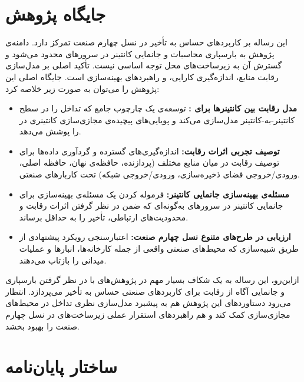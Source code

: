 \section{جایگاه پژوهش}

این رساله بر کاربردهای حساس به تأخیر در نسل چهارم صنعت تمرکز دارد. دامنه‌ی پژوهش به بارسپاری محاسبات و جانمایی کانتینر در سرورهای  محدود می‌شود و گسترش آن به زیرساخت‌های محل توجه اساسی نیست. تأکید اصلی بر مدل‌سازی رقابت منابع، اندازه‌گیری کارایی، و راهبردهای بهینه‌سازی است.
جایگاه اصلی این پژوهش را می‌توان به صورت زیر خلاصه کرد:

\begin{itemize}
\item
\textbf{مدل رقابت بین کانتینر‌ها برای :}
توسعه‌ی یک چارچوب جامع که تداخل را در سطح کانتینر-به-کانتینر مدل‌سازی می‌کند و پویایی‌های پیچیده‌ی مجازی‌سازی کانتینری در  را پوشش می‌دهد.

\item
\textbf{توصیف تجربی اثرات رقابت:}
اندازه‌گیری‌های گسترده و گردآوری داده‌ها برای توصیف رقابت در میان منابع مختلف (پردازنده، حافظه‌ی نهان، حافظه اصلی، ورودی/خروجی فضای ذخیره‌سازی، ورودی/خروجی شبکه) تحت کاربارهای صنعتی.

\item
\textbf{مسئله‌ی بهینه‌سازی جانمایی کانتینر:}
فرموله‌ کردن یک مسئله‌ی بهینه‌سازی برای جانمایی کانتینر در سرورهای  به‌گونه‌ای که ضمن در نظر گرفتن اثرات رقابت و محدودیت‌های ارتباطی، تأخیر را به حداقل برساند.

\item
\textbf{ارزیابی در طرح‌های متنوع نسل چهارم صنعت:}
اعتبارسنجی رویکرد پیشنهادی از طریق شبیه‌سازی‌ که محیط‌های صنعتی واقعی از جمله کارخانه‌ها، انبارها و عملیات میدانی را بازتاب می‌دهند.

\end{itemize}

ازاین‌رو، این رساله به یک شکاف بسیار مهم در پژوهش‌های  با در نظر گرفتن بارسپاری و جانمایی آگاه از رقابت برای کاربردهای صنعتی حساس به تأخیر می‌پردازد. انتظار می‌رود دستاوردهای این پژوهش هم به پیشبرد مدل‌سازی نظری تداخل در محیط‌های مجازی‌سازی کمک کند و هم راهبردهای استقرار عملی زیرساخت‌های  در نسل چهارم صنعت را بهبود بخشد.

\section{ساختار پایان‌نامه}

